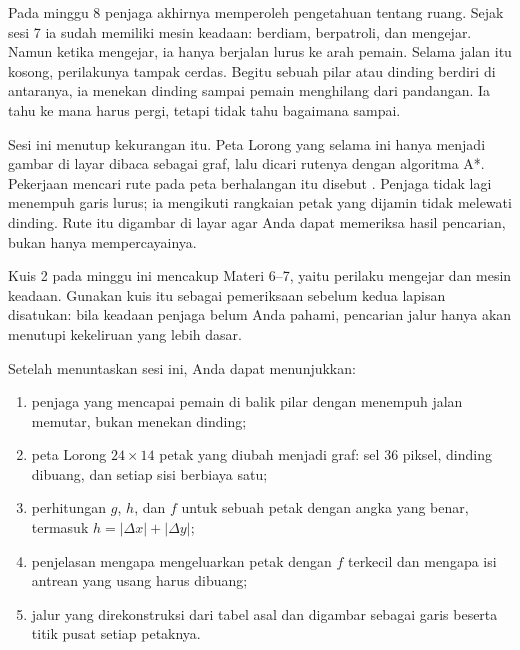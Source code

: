 

Pada minggu 8 penjaga akhirnya memperoleh pengetahuan tentang ruang. Sejak
sesi 7 ia sudah memiliki mesin keadaan: berdiam, berpatroli, dan mengejar.
Namun ketika mengejar, ia hanya berjalan lurus ke arah pemain. Selama jalan
itu kosong, perilakunya tampak cerdas. Begitu sebuah pilar atau dinding
berdiri di antaranya, ia menekan dinding sampai pemain menghilang dari
pandangan. Ia tahu ke mana harus pergi, tetapi tidak tahu bagaimana sampai.

Sesi ini menutup kekurangan itu. Peta Lorong yang selama ini hanya menjadi
gambar di layar dibaca sebagai graf, lalu dicari rutenya dengan algoritma
A*. Pekerjaan mencari rute pada peta berhalangan itu disebut
. Penjaga tidak lagi menempuh garis lurus; ia mengikuti
rangkaian petak yang dijamin tidak melewati dinding. Rute itu digambar di
layar agar Anda dapat memeriksa hasil pencarian, bukan hanya mempercayainya.

Kuis 2 pada minggu ini mencakup Materi 6--7, yaitu perilaku mengejar dan
mesin keadaan. Gunakan kuis itu sebagai pemeriksaan sebelum kedua lapisan
disatukan: bila keadaan penjaga belum Anda pahami, pencarian jalur hanya
akan menutupi kekeliruan yang lebih dasar.


\begin{tujuanbox}
Setelah menuntaskan sesi ini, Anda dapat menunjukkan:
\begin{enumerate}[leftmargin=1.5em, itemsep=0.2em]
  \item penjaga yang mencapai pemain di balik pilar dengan menempuh jalan
        memutar, bukan menekan dinding;
  \item peta Lorong $24 \times 14$ petak yang diubah menjadi graf: sel
        36 piksel, dinding dibuang, dan setiap sisi berbiaya satu;
  \item perhitungan $g$, $h$, dan $f$ untuk sebuah petak dengan angka yang
        benar, termasuk $h = |\Delta x| + |\Delta y|$;
  \item penjelasan mengapa  mengeluarkan petak dengan $f$
        terkecil dan mengapa isi antrean yang usang harus dibuang;
  \item jalur yang direkonstruksi dari tabel asal dan digambar sebagai garis
        beserta titik pusat setiap petaknya.
\end{enumerate}
\end{tujuanbox}

